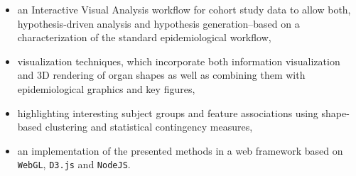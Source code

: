 \documentclass[journal]{style/vgtc} 			          %
\begin{document}
\begin{itemize}
	\item an Interactive Visual Analysis workflow for cohort study data to allow both, hypothesis-driven analysis and hypothesis generation--based on a characterization of the standard epidemiological workflow,
	\item visualization techniques, which incorporate both information visualization and 3D rendering of organ shapes as well as combining them with epidemiological graphics and key figures,
	\item highlighting interesting subject groups and feature associations using shape-based clustering and statistical contingency measures,
	\item an implementation of the presented methods in a web framework based on \texttt{WebGL}, \texttt{D3.js} and \texttt{NodeJS}.
\end{itemize}
\end{document}
